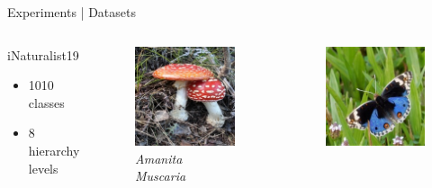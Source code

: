 \begin{frame}{Experiments | Datasets}
  \begin{columns}
    \begin{column}{0.35\textwidth}
      \alert{{\large iNaturalist19}}
      \begin{itemize}
        \item 1010 classes
        \item 8 hierarchy levels
      \end{itemize}
    \end{column}
    \begin{column}{0.2\textwidth}
      \begin{figure}
        \centering
        \includegraphics[width=.7\linewidth]{figures/04/iNaturalist19/example_1.jpg}
        \captionsetup{labelformat=empty, justification=centering, font=scriptsize}
        \caption{\emph{Amanita Muscaria}}
      \end{figure}
    \end{column}
    \begin{column}{0.2\textwidth}
      \begin{figure}
        \centering
        \includegraphics[width=.7\linewidth]{figures/04/iNaturalist19/example_2.jpg}

\end{figure}
\end{column}
\end{columns}
\end{frame}
